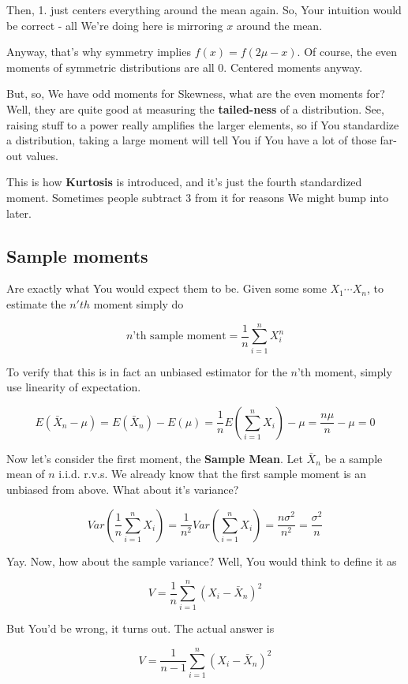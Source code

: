 \documentclass{article}
\begin{document}
		Then, 1. just centers everything around the mean again. So, Your intuition would be correct - all We're doing here is mirroring $x$ around the mean.
		
		Anyway, that's why symmetry implies $f(x) = f(2\mu - x)$. Of course, the even moments of symmetric distributions are all 0. Centered moments anyway.
		
		But, so, We have odd moments for Skewness, what are the even moments for? Well, they are quite good at measuring the \textbf{tailed-ness} of a distribution. See, raising stuff to a power really amplifies the larger elements, so if You standardize a distribution, taking a large moment will tell You if You have a lot of those far-out values. 
		
		This is how \textbf{Kurtosis} is introduced, and it's just the fourth standardized moment. Sometimes people subtract 3 from it for reasons We might bump into later.
		
	\subsection{Sample moments}
	
		Are exactly what You would expect them to be. Given some some $X_1\cdots X_n$, to estimate the $n'th$ moment simply do
		
		\[ n\text{'th sample moment} = \frac{1}{n}\sum^n_{i=1} X_i^n\]
		
		To verify that this is in fact an unbiased estimator for the $n$'th moment, simply use linearity of expectation.
		
		\[ E(\bar{X}_n - \mu) = E(\bar{X}_n) - E(\mu) = \frac{1}{n}E(\sum^n_{i=1} X_i) - \mu = \frac{n\mu}{n} - \mu = 0\]
		
		Now let's consider the first moment, the \textbf{Sample Mean}. Let $\bar{X}_n$ be a sample mean of $n$ i.i.d. r.v.s. We already know that the first sample moment is an unbiased from above. What about it's variance? 
		
		\[ Var\left(\frac{1}{n}\sum^n_{i=1} X_i \right) = \frac{1}{n^2}Var\left(\sum^n_{i=1} X_i \right) = \frac{n\sigma^2}{n^2} = \frac{\sigma^2}{n} \]
		
		Yay. Now, how about the sample variance? Well, You would think to define it as 
		
		\[ V = \frac{1}{n} \sum^n_{i=1} (X_i - \bar{X}_n)^2 \]
		
		But You'd be wrong, it turns out. The actual answer is 
		
		\[ V = \frac{1}{n-1} \sum^n_{i=1} (X_i - \bar{X}_n)^2 \]
		
\end{document}
